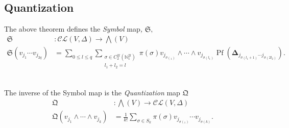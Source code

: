 \documentclass[aps, preprint]{revtex4}
\begin{document}
\subsection{Quantization}
The above theorem defines the \emph{Symbol} map\emph{, }$\mathfrak{S}\text{,}$
\begin{align}\mathfrak{S} &  :\mathcal{C} \mathcal{L} \left (V ,\Delta \right ) \longrightarrow \bigwedge \left (V\right ) \\
\mathfrak{S} \left (v_{j_{1}} \cdots  v_{j_{2 q}}\right ) &  ={\displaystyle\sum _{0 \leq l \leq q}}{\displaystyle\sum _{\begin{array}{c}\sigma  \in C_{2}^{2 l} \left (\mathbb{N}_{1}^{2 l}\right ) \\
l_{1} +l_{2} =l\end{array}}}\pi  \left (\sigma \right ) v_{j_{\sigma  \left (_{1}\right )}} \wedge \cdots  \wedge v_{j_{\sigma  \left (l_{1}\right )}} \ensuremath{\operatorname*{Pf}} \left (\mathbf{\Delta }_{j_{\sigma  \left (l_{1} +1\right )} \cdots  j_{\sigma  \left (2 l_{2}\right )}}\right )\text{.}\end{align}\emph{\ } 

The inverse of the Symbol map
is the \emph{Quantization} map $\mathfrak{Q}$
\begin{align}\mathfrak{Q} &  :\bigwedge \left (V\right ) \longrightarrow \mathcal{C} \mathcal{L} \left (V ,\Delta \right ) \\
\mathfrak{Q} \left (v_{j_{1}} \wedge \cdots  \wedge v_{j_{k}}\right ) &  =\frac{1}{k !} \sum _{\sigma  \in S_{k}}\pi  \left (\sigma \right ) v_{j_{\sigma  \left (_{1}\right )}} \cdots  v_{j_{\sigma  \left (k\right )}}\text{.}\end{align}
\end{document}
